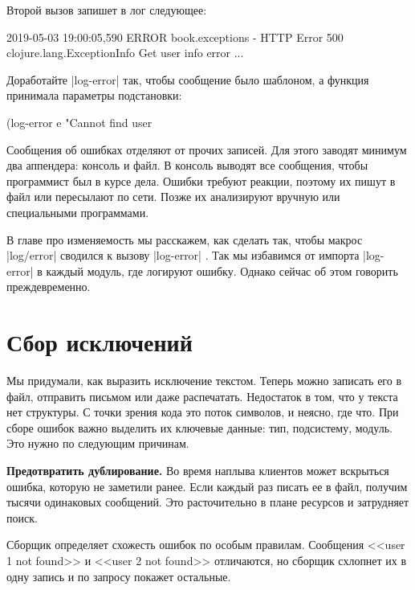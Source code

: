 Второй вызов запишет в лог следующее:

\begin{english}
  \begin{text}
2019-05-03 19:00:05,590 ERROR book.exceptions - HTTP Error 500
clojure.lang.ExceptionInfo
  Get user info error
  ...
  \end{text}
\end{english}

Доработайте \spverb|log-error| так, чтобы сообщение было шаблоном, а функция
принимала параметры подстановки:

\begin{english}
  \begin{clojure}
(log-error e "Cannot find user %
  \end{clojure}
\end{english}

Сообщения об ошибках отделяют от прочих записей. Для этого заводят минимум два
аппендера: консоль и файл. В консоль выводят все сообщения, чтобы программист
был в курсе дела. Ошибки требуют реакции, поэтому их пишут в файл или пересылают
по сети. Позже их анализируют вручную или специальными программами.

В главе про изменяемость мы расскажем, как сделать так, чтобы макрос
\spverb|log/error| сводился к вызову \spverb|log-error| .
Так мы избавимся от импорта \spverb|log-error| в каждый модуль, где логируют ошибку.
Однако сейчас об этом говорить преждевременно.


\section{Сбор исключений}

Мы придумали, как выразить исключение текстом. Теперь можно записать его в файл,
отправить письмом или даже распечатать. Недостаток в том, что у текста нет
структуры. С точки зрения кода это поток символов, и неясно, где что. При сборе
ошибок важно выделить их ключевые данные: тип, подсистему, модуль. Это нужно по
следующим причинам.

\textbf{Предотвратить дублирование.} Во время наплыва клиентов может вскрыться
ошибка, которую не заметили ранее. Если каждый раз писать ее в файл, получим
тысячи одинаковых сообщений. Это расточительно в плане ресурсов и затрудняет
поиск.

Сборщик определяет схожесть ошибок по особым правилам. Сообщения <<user 1 not
found>> и <<user 2 not found>> отличаются, но сборщик схлопнет их в одну запись
и по запросу покажет остальные.

